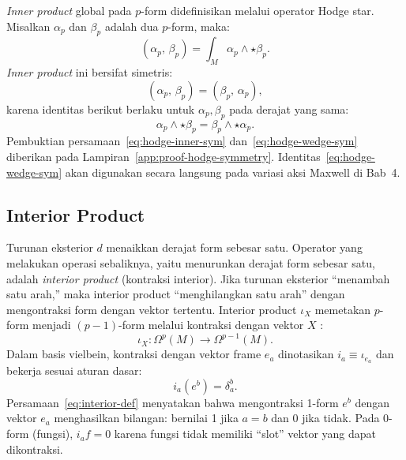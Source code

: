 \textit{Inner product} global pada $p$-form didefinisikan melalui operator Hodge star. Misalkan $\alpha_p$ dan $\beta_p$ adalah dua $p$-form, maka:
\begin{equation}\label{eq:hodge-inner}
    (\alpha_p,\, \beta_p) = \int_M \alpha_p \wedge \star\beta_p.
\end{equation}
\textit{Inner product} ini bersifat simetris:
\begin{equation}\label{eq:hodge-inner-sym}
    (\alpha_p,\, \beta_p) = (\beta_p,\, \alpha_p),
\end{equation}
karena identitas berikut berlaku untuk $\alpha_p, \beta_p$ pada derajat yang sama:
\begin{equation}\label{eq:hodge-wedge-sym}
    \alpha_p \wedge \star\beta_p = \beta_p \wedge \star\alpha_p.
\end{equation}
Pembuktian persamaan~\eqref{eq:hodge-inner-sym} dan~\eqref{eq:hodge-wedge-sym} diberikan pada Lampiran~\ref{app:proof-hodge-symmetry}. Identitas~\eqref{eq:hodge-wedge-sym} akan digunakan secara langsung pada variasi aksi Maxwell di Bab~4.


\subsection{Interior Product}
\label{subsec:interior-product}

Turunan eksterior $d$ menaikkan derajat form sebesar satu. Operator yang melakukan operasi sebaliknya, yaitu menurunkan derajat form sebesar satu, adalah \textit{interior product} (kontraksi interior). Jika turunan eksterior ``menambah satu arah,'' maka interior product ``menghilangkan satu arah'' dengan mengontraksi form dengan vektor tertentu. Interior product $\iota_X$ memetakan $p$-form menjadi $(p-1)$-form melalui kontraksi dengan vektor $X$ \cite{nakahara2003geometry, eguchi1980}:
\begin{equation}
    \iota_X : \Omega^p(M) \longrightarrow \Omega^{p-1}(M).
\end{equation}
Dalam basis vielbein, kontraksi dengan vektor frame $e_a$ dinotasikan $i_a \equiv \iota_{e_a}$ dan bekerja sesuai aturan dasar:
\begin{equation}\label{eq:interior-def}
    i_a(e^b) = \delta^b_a.
\end{equation}
Persamaan~\eqref{eq:interior-def} menyatakan bahwa mengontraksi 1-form $e^b$ dengan vektor $e_a$ menghasilkan bilangan: bernilai 1 jika $a = b$ dan 0 jika tidak. Pada 0-form (fungsi), $i_a f = 0$ karena fungsi tidak memiliki ``slot'' vektor yang dapat dikontraksi.

